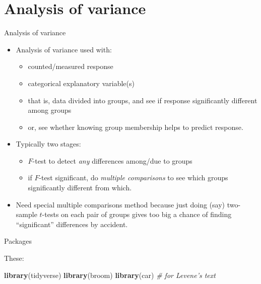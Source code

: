 \documentclass[
  ignorenonframetext,
]{beamer}
\newenvironment{Shaded}{\begin{snugshade}}{\end{snugshade}}
\newcommand{\CommentTok}[1]{\textcolor[rgb]{0.56,0.35,0.01}{\textit{#1}}}
\newcommand{\KeywordTok}[1]{\textcolor[rgb]{0.13,0.29,0.53}{\textbf{#1}}}
\newcommand{\NormalTok}[1]{#1}
\begin{document}
\hypertarget{analysis-of-variance}{%
\section{Analysis of variance}\label{analysis-of-variance}}

\begin{frame}{Analysis of variance}
\protect\hypertarget{analysis-of-variance-1}{}

\begin{itemize}
\item
  Analysis of variance used with:

  \begin{itemize}
  \item
    counted/measured response
  \item
    categorical explanatory variable(s)
  \item
    that is, data divided into groups, and see if response significantly
    different among groups
  \item
    or, see whether knowing group membership helps to predict response.
  \end{itemize}
\item
  Typically two stages:

  \begin{itemize}
  \item
    \(F\)-test to detect \emph{any} differences among/due to groups
  \item
    if \(F\)-test significant, do \emph{multiple comparisons} to see
    which groups significantly different from which.
  \end{itemize}
\item
  Need special multiple comparisons method because just doing (say)
  two-sample \(t\)-tests on each pair of groups gives too big a chance
  of finding ``significant'' differences by accident.
\end{itemize}

\end{frame}

\begin{frame}[fragile]{Packages}
\protect\hypertarget{packages-2}{}

These:

\begin{Shaded}
\begin{Highlighting}[]
\KeywordTok{library}\NormalTok{(tidyverse)}
\KeywordTok{library}\NormalTok{(broom)}
\KeywordTok{library}\NormalTok{(car) }\CommentTok{# for Levene's text}
\end{Highlighting}
\end{Shaded}

\end{frame}
\end{document}
